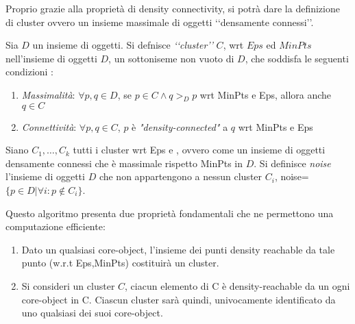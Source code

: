 Proprio grazie alla proprietà di density connectivity, si potrà dare la definizione di cluster ovvero un insieme massimale di oggetti \lq\lq densamente connessi\rq\rq.
\begin{definizione}[cluster]
\label{def:cluster}
Sia $D$ un insieme di oggetti.
Si defnisce \emph{\lq\lq cluster\rq\rq}  $C$,  wrt $Eps$ ed $MinPts$ nell'insieme di oggetti $D$,
un sottoniseme non vuoto di $D$, che soddisfa le seguenti condizioni :
\begin{enumerate}
\item \emph{Massimalità}: $\forall p,q\in D$, se $p \in C \land q>_{D}p$ wrt MinPts e Eps, 
allora anche $q \in C  $

\item \emph{Connettività}: $\forall p,q\in C$, $p$ è \emph{"density-connected"} a $q$  wrt MinPts e Eps

\end{enumerate}
 
\end{definizione} 


\begin{definizione}[noise]
\label{def:noise}
Siano $C_1,\dots,C_k$ tutti i cluster wrt Eps e , ovvero come un insieme di oggetti densamente connessi che è massimale rispetto MinPts in $D$. Si definisce \emph{noise}  l'insieme di oggetti $D$ che non appartengono a nessun cluster $C_i$,
noise=$\lbrace p\in D | \forall i: p \notin C_i \rbrace $.
 
\end{definizione}
Questo algoritmo presenta due proprietà fondamentali che ne permettono una computazione efficiente:
\begin{enumerate}
\item Dato un qualsiasi core-object, l'insieme dei punti density reachable da tale punto (w.r.t Eps,MinPts) costituirà un cluster.
\item  Si consideri un cluster $C$, ciacun elemento di C è density-reachable da  un ogni core-object in C. Ciascun cluster sarà quindi, univocamente identificato da uno qualsiasi dei suoi core-object.
\end{enumerate}

